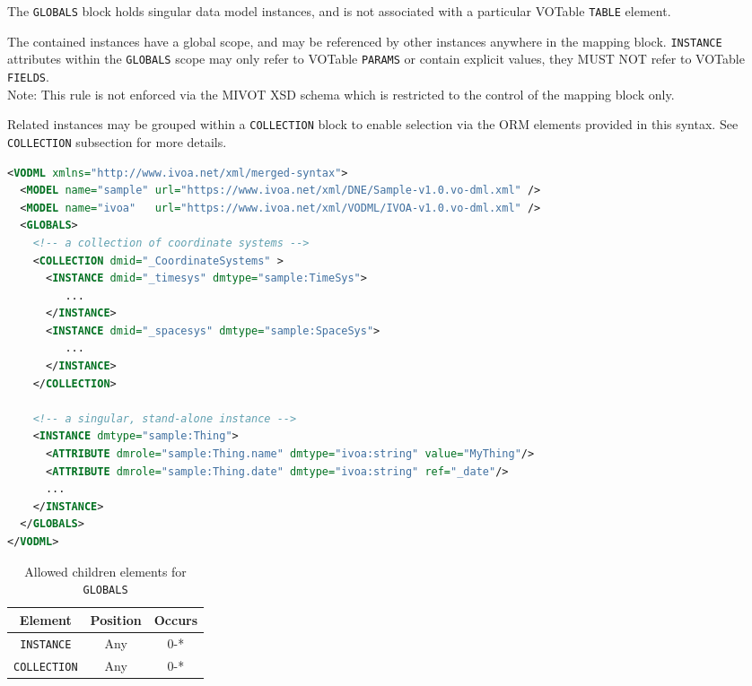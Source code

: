 The \texttt{GLOBALS} block holds singular data model instances, and is not associated 
with a particular VOTable \texttt{TABLE} element.

The contained instances have a global scope, and may be
referenced by other instances anywhere in the mapping block.  \texttt{INSTANCE} attributes
within the \texttt{GLOBALS} scope may only refer to VOTable \texttt{PARAMS} or contain
explicit values, they MUST NOT refer to VOTable \texttt{FIELDS}.  \\ 
Note: This rule is not enforced via the MIVOT XSD schema which is restricted to the control of the mapping block only.

Related instances may be grouped within a \texttt{COLLECTION} block to enable selection
via the ORM elements provided in this syntax.  See \texttt{COLLECTION} subsection for more details.

\begin{lstlisting}[caption={Example \texttt{GLOBALS} block},language=XML]
<VODML xmlns="http://www.ivoa.net/xml/merged-syntax">
  <MODEL name="sample" url="https://www.ivoa.net/xml/DNE/Sample-v1.0.vo-dml.xml" />
  <MODEL name="ivoa"   url="https://www.ivoa.net/xml/VODML/IVOA-v1.0.vo-dml.xml" />
  <GLOBALS>
    <!-- a collection of coordinate systems -->
    <COLLECTION dmid="_CoordinateSystems" >
      <INSTANCE dmid="_timesys" dmtype="sample:TimeSys">
         ...
      </INSTANCE>
      <INSTANCE dmid="_spacesys" dmtype="sample:SpaceSys">
         ...
      </INSTANCE>
    </COLLECTION>

    <!-- a singular, stand-alone instance -->
    <INSTANCE dmtype="sample:Thing">
      <ATTRIBUTE dmrole="sample:Thing.name" dmtype="ivoa:string" value="MyThing"/>
      <ATTRIBUTE dmrole="sample:Thing.date" dmtype="ivoa:string" ref="_date"/>
      ...
    </INSTANCE>
  </GLOBALS>
</VODML>
\end{lstlisting}


\begin{table}[!htbp]
  \small
  \centering
  \begin{tabulary}{\linewidth}{|c |c |c|}
    \hline 
        \textbf{Element} &
        \textbf{Position} &
        \textbf{Occurs}\\
    \hline
    \hline
        \texttt{INSTANCE} &
        Any &
        0-*\\
    \hline
        \texttt{COLLECTION} &
        Any &
        0-*\\
    \hline
  \end{tabulary}
  \caption{Allowed children elements for \texttt{GLOBALS}} 
  \label{tbl:globals-children}
 \end{table}
